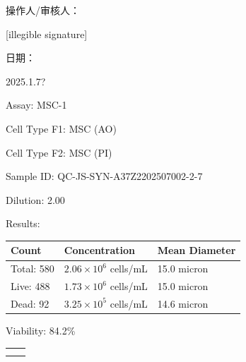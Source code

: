 \documentclass[UTF8,10pt,a4paper,fontset=fandol]{ctexart}
\newcommand{\fieldvalue}[1]{#1}
\newcommand{\handwritten}[1]{#1}
\begin{document}
\begin{center}
\begin{center}
\vfill

\noindent 操作人/审核人：

\fieldvalue{\handwritten{[illegible signature]}}

\hfill 日期：

\fieldvalue{\handwritten{2025.1.7?}}

\newpage

Assay: \fieldvalue{MSC-1}

\medskip
Cell Type F1: \fieldvalue{MSC (AO)}

Cell Type F2: \fieldvalue{MSC (PI)}

\medskip
Sample ID: \fieldvalue{QC-JS-SYN-A37Z2202507002-2-7}

Dilution: \fieldvalue{2.00}

\medskip
\noindent\hrulefill

Results:

\medskip
\begin{tabular}{lll}
\textbf{Count} & \textbf{Concentration} & \textbf{Mean Diameter} \\
\hline
Total:
\fieldvalue{580}
&
\fieldvalue{$2.06{\times}10^{6}$ cells/mL}
&
\fieldvalue{15.0 micron}
\\
Live:
\fieldvalue{488}
&
\fieldvalue{$1.73{\times}10^{6}$ cells/mL}
&
\fieldvalue{15.0 micron}
\\
Dead:
\fieldvalue{92}
&
\fieldvalue{$3.25{\times}10^{5}$ cells/mL}
&
\fieldvalue{14.6 micron}
\end{tabular}

\medskip
Viability: \fieldvalue{84.2\%}

\bigskip

\begin{center}
\begin{tabular}{cc}
\fbox{\parbox[c][0.22\textheight][c]{0.42\textwidth}{\centering
}} &
\fbox{\parbox[c][0.22\textheight][c]{0.42\textwidth}{\centering
}} \\[1em]
\fbox{\parbox[c][0.22\textheight][c]{0.22\textheight}{\centering
}} &
\fbox{\parbox[c][0.22\textheight][c]{0.42\textwidth}{\centering
}}
\end{tabular}
\end{center}


\end{center}
\end{center}
\end{document}
